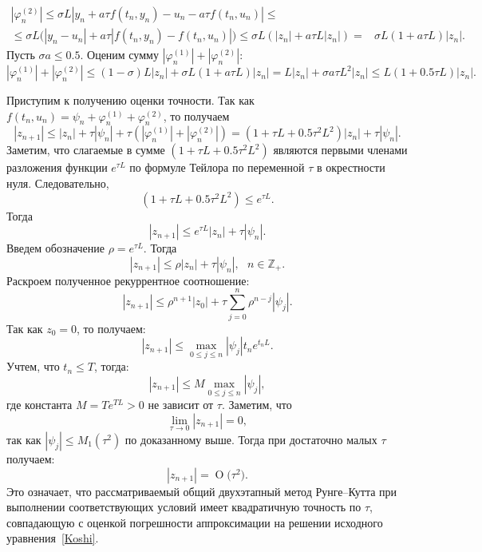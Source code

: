 \documentclass[11pt,a4paper,twoside]{report}
\numberwithin{equation}{section}
\theoremstyle{definition}
\theoremstyle{plain}
\newcommand{\bigO}[1]{\ensuremath{\operatorname{O}\bigl(#1\bigr)}}
\begin{document}
%
\begin{equation*}
%
    \begin{split}
        |\varphi_n^{(2)}| \leqslant \sigma L|y_n + a\tau f(t_n, y_n) - u_n -
        a\tau f(t_n, u_n)| \leqslant \\
        \leqslant \sigma L\big(|y_n - u_n| + a\tau |f(t_n, y_n) - f(t_n, u_n)|\big)
        \leqslant \sigma L(|z_n| +
        a\tau L|z_n|) =& \sigma L(1 + a\tau L)|z_n|.
    \end{split}
%
\end{equation*}
%
Пусть $\sigma a \leqslant 0.5$.
Оценим сумму $|\varphi_n^{(1)}| + |\varphi_n^{(2)}|$:
%
\begin{equation*}
%
    |\varphi_n^{(1)}| + |\varphi_n^{(2)}| \leqslant (1-\sigma) L|z_n| +
    \sigma L(1 + a\tau L)|z_n| =  L|z_n| + \sigma a\tau L^2|z_n| \leqslant
    L(1 + 0.5\tau L)|z_n|.
%
\end{equation*}
%

Приступим к получению оценки точности.
Так как $f(t_n, u_n) = \psi_n + \varphi_n^{(1)} + \varphi_n^{(2)}$, то получаем
%
$$
    |z_{n+1}| \leqslant |z_n| + \tau|\psi_n| + \tau(|\varphi_n^{(1)}| + |\varphi_n^{(2)}|) =
    (1+\tau L + 0.5\tau^2L^2)|z_n| + \tau|\psi_n|.
$$
%
Заметим, что слагаемые в сумме $(1 + \tau L + 0.5\tau^2L^2)$ являются первыми
членами разложения функции $e^{\tau L}$ по формуле Тейлора по переменной $\tau$
в окрестности нуля.
Следовательно,
%
$$
    (1+\tau L + 0.5\tau^2L^2) \leqslant e^{\tau L}.
$$
%
Тогда
%
$$
    |z_{n+1}| \leqslant e^{\tau L} |z_n| + \tau|\psi_n|.
$$
%
Введем обозначение $\rho = e^{\tau L}$. Тогда
%
\begin{equation}
%
    \label{z_rho_psi}
    |z_{n+1}| \leqslant \rho|z_n| + \tau|\psi_n|,~~~n\in\mathbb{Z}_+.
%
\end{equation}
%
Раскроем полученное рекуррентное соотношение:
%
$$
    |z_{n+1}| \leqslant \rho^{n+1}|z_0| + \tau\sum_{j=0}^n \rho^{n-j}|\psi_j|.
$$
%
Так как $z_0 = 0$, то получаем:
%
\begin{equation}
%
    \label{z_max_psi}
    |z_{n+1}| \leqslant \max_{0 \leqslant j \leqslant n}|\psi_j| t_n e^{t_n L}.
%
\end{equation}
%
Учтем, что $t_n \leqslant T$, тогда:
%
$$
    |z_{n+1}| \leqslant M\max_{0 \leqslant j \leqslant n}|\psi_j|,
$$
%
где константа $M=Te^{TL}>0$ не зависит от $\tau$.
Заметим, что
%
$$
    \lim\limits_{\tau\rightarrow0}|z_{n+1}| = 0,
$$
%
так как $|\psi_j| \leqslant M_1(\tau^2)$ по доказанному выше.
Тогда при достаточно малых $\tau$ получаем:
%
$$
    |z_{n+1}| = \bigO{\tau^2}.
$$
%
Это означает, что рассматриваемый общий двухэтапный метод Рунге--Кутта
при выполнении соответствующих условий
имеет квадратичную точность по $\tau$,
совпадающую с оценкой погрешности аппроксимации на решении исходного уравнения~\eqref{Koshi}.
%
\end{document}

